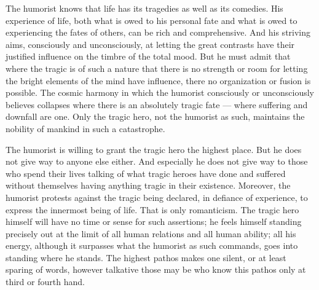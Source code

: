 \documentclass[12pt]{book}
\newcommand{\opage}[1]{\marginnote{\footnotesize\textit{[#1]}}}
\begin{document}
The humorist knows that life has its tragedies as well as its comedies. His experience of
life, both what is owed to his personal fate and what is owed to experiencing the fates of
others, can be rich and comprehensive. And his striving aims, consciously and
unconsciously, at letting the great contrasts have their justified influence on the timbre
of the total mood. But he must admit that where the tragic is of such a nature that there
is no strength or room for letting the bright elements of the mind have influence, there no
organization or fusion is possible. The cosmic harmony in which the humorist consciously
or \opage{103}unconsciously believes collapses where there is an absolutely tragic fate ---
where suffering and downfall are one. Only the tragic hero, not the humorist as such,
maintains the nobility of mankind in such a catastrophe.

The humorist is willing to grant the tragic hero the highest place. But he does not give
way to anyone else either. And especially he does not give way to those who spend their
lives talking of what tragic heroes have done and suffered without themselves having
anything tragic in their existence. Moreover, the humorist protests against the tragic
being declared, in defiance of experience, to express the innermost being of life. That is
only romanticism. The tragic hero himself will have no time or sense for such assertions;
he feels himself standing precisely out at the limit of all human relations and all human
ability; all his energy, although it surpasses what the humorist as such commands, goes
into standing where he stands. The highest pathos makes one silent, or at least sparing of
words, however talkative those may be who know this pathos only at third or fourth hand.
\end{document}
